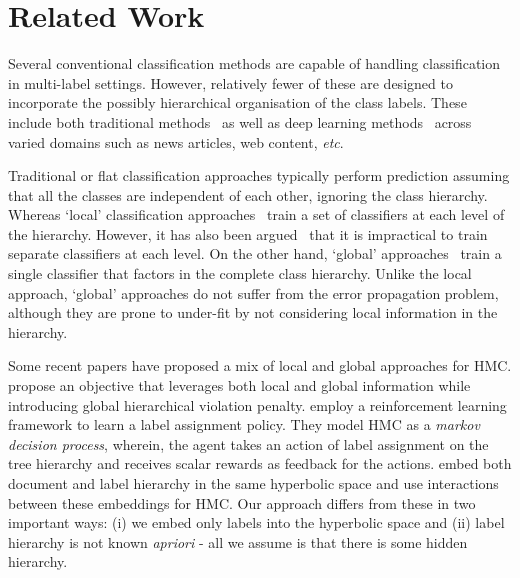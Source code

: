 \documentclass[11pt,a4paper]{article}
\begin{document}
\section{Related Work}
Several conventional classification methods are capable of handling classification in multi-label settings. However, relatively fewer of these are designed to incorporate the possibly hierarchical organisation of the class labels. These include both traditional methods~\citep{gopal2013recursive, rcv1} as well as deep learning methods~\citep{johnson2015effective,peng2018large} across varied domains such as news articles, web content, \emph{etc}.

Traditional or flat classification approaches typically perform prediction assuming that all the classes are independent of each other, ignoring the class hierarchy. Whereas `local' classification approaches~\citep{koller1997hierarchically, cesa2006hierarchical} train a set of classifiers at each level of the hierarchy. However, it has also been argued~\citep{cerri2011hierarchical} that it is impractical to train separate classifiers at each level. On the other hand, `global' approaches~\citep{silla2009global, wang2001hierarchical} train a single classifier that factors in the complete class hierarchy. Unlike the local approach, `global' approaches do not suffer from the error propagation problem, although they are prone to under-fit by not considering local information in the hierarchy.

Some recent papers have proposed a mix of local and global approaches for HMC. \citet{hmcn} propose an objective that leverages both local and global information while introducing global hierarchical violation penalty. \citet{emnlp} employ a reinforcement learning framework to learn a label assignment policy. They model HMC as a \textit{markov decision process}, wherein, the agent takes an action of label assignment on the tree hierarchy  and receives scalar rewards as feedback for the actions. \citet{hyperim} embed both document and label hierarchy in the same hyperbolic space and use interactions between these embeddings for HMC. Our approach differs from these in two important ways: (i) we embed only labels into the hyperbolic space and (ii) label hierarchy is not known \textit{apriori} - all we assume is that there is some hidden hierarchy. 
\end{document}
